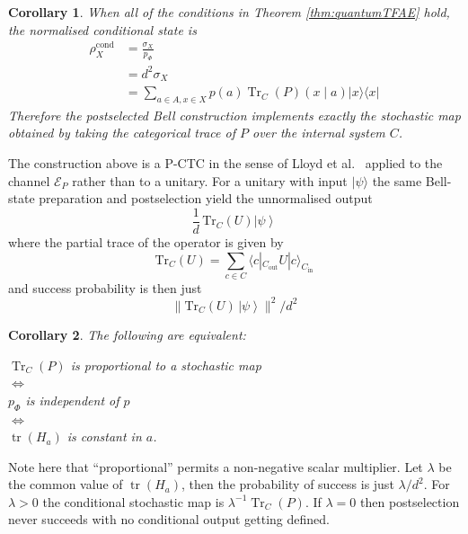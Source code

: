 \documentclass[10pt, a4paper]{article}
\newcommand{\ket}[1]{\left|{#1}\right\rangle}
\newcommand{\ketbra}[2]{|{#1}\rangle\langle{#2}|}
\newcommand{\Tr}[0]{\operatorname{Tr}}
\newcommand{\tr}[0]{\operatorname{tr}}
\newtheorem{corollary}{Corollary}
\begin{document}
\begin{corollary}
   When all of the conditions in Theorem \ref{thm:quantumTFAE} hold, the normalised conditional state is
    \begin{align*}
        \rho^{\mathrm{cond}}_X &= \frac{\sigma_X}{p_\Phi} \\
        &= d^2\sigma_X \\
        &= \sum_{a \in A, x \in X} p(a) \Tr_C(P) (x \mid a) \ketbra{x}{x}
    \end{align*}
    Therefore the postselected Bell construction implements exactly the stochastic map obtained by taking the categorical trace of $P$ over the internal system $C$.
\end{corollary}


The construction above is a P-CTC in the sense of Lloyd et al.\ \cite{Lloyd2011-zc,Lloyd2011b} applied to the channel $\mathcal{E}_P$ rather than to a unitary. For a unitary with input $|\psi\rangle$ the same Bell-state preparation and postselection yield the unnormalised output $$\frac{1}{d}\,\mathrm{Tr}_C(U)\ket{\psi}$$ where the partial trace of the operator is given by $$\mathrm{Tr}_C(U) = \sum_{c \in C} \langle c|_{C_{\mathrm{out}}} U |c\rangle_{C_{\mathrm{in}}}$$ and success probability is then just $$\|\mathrm{Tr}_C(U)\,\ket{\psi}\|^2 / d^2$$ 

\begin{corollary}
    The following are equivalent: 
    \begin{center}
    $\Tr_C(P)$ is proportional to a stochastic map \\
    $\iff$ \\
    $p_\Phi$ is independent of $p$ \\
    $\iff$ \\
    $\tr (H_a)$ is constant in $a$.
    \end{center}
\end{corollary}

Note here that ``proportional'' permits a non-negative scalar multiplier. Let $\lambda$ be the common value of $\tr(H_a)$, then the probability of success is just $\lambda/d^2$. For $\lambda > 0$ the conditional stochastic map is $\lambda^{-1} \Tr_C(P)$. If $\lambda = 0$ then postselection never succeeds with no conditional output getting defined.
\end{document}
